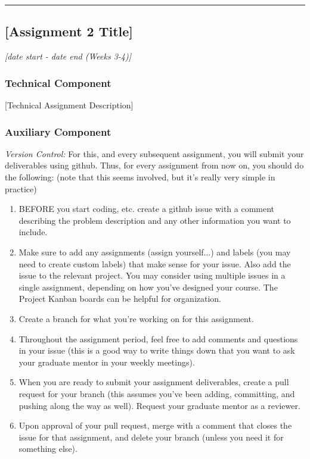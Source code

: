 \documentclass[12pt]{article}
\begin{document}
\vspace{1em}\hrule\vspace{1em}
\subsection{[Assignment 2 Title]}
\label{ssec:a2}
\textit{[date start - date end (Weeks 3-4)]}


\subsubsection{Technical Component}
\label{sssec:a2t}

[Technical Assignment Description]


\subsubsection{Auxiliary Component}
\label{sssec:a2a}

\noindent \textit{Version Control:}
For this, and every subsequent assignment, you will submit your deliverables using github.  Thus, for every assignment from now on, you should do the following: (note that this seems involved, but it's really very simple in practice)

\begin{enumerate}
	\item BEFORE you start coding, etc. create a github issue with a comment describing the problem description and any other information you want to include.
	\item Make sure to add any assignments (assign yourself...) and labels (you may need to create custom labels) that make sense for your issue. Also add the issue to the relevant project.  You may consider using multiple issues in a single assignment, depending on how you've designed your course.  The Project Kanban boards can be helpful for organization.
	\item Create a branch for what you're working on for this assignment.
	\item Throughout the assignment period, feel free to add comments and questions in your issue (this is a good way to write things down that you want to ask your graduate mentor in your weekly meetings).
	\item When you are ready to submit your assignment deliverables, create a pull request for your branch (this assumes you've been adding, committing, and pushing along the way as well). Request your graduate mentor as a reviewer.
	\item Upon approval of your pull request, merge with a comment that closes the issue for that assignment, and delete your branch (unless you need it for something else).
\end{enumerate}
\end{document}
